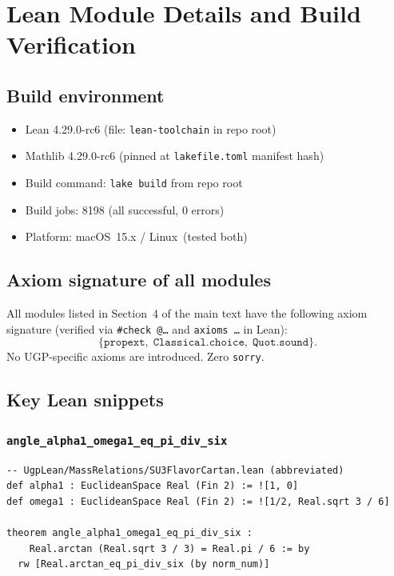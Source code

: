 \documentclass[11pt]{article}
\theoremstyle{remark}
\newcommand{\lean}[1]{\texttt{#1}}
\begin{document}
\section{Lean Module Details and Build Verification}
\label{sec:si_lean}

\subsection{Build environment}

\begin{itemize}
  \item Lean 4.29.0-rc6 (file: \texttt{lean-toolchain} in repo root)
  \item Mathlib 4.29.0-rc6 (pinned at \texttt{lakefile.toml} manifest hash)
  \item Build command: \texttt{lake build} from repo root
  \item Build jobs: 8198 (all successful, 0 errors)
  \item Platform: macOS~15.x / Linux~(tested both)
\end{itemize}

\subsection{Axiom signature of all modules}

All modules listed in Section~4 of the main text have the following
axiom signature (verified via \texttt{\#check @\ldots} and
\texttt{axioms \ldots} in Lean):
\[
  \{\texttt{propext},\; \texttt{Classical.choice},\; \texttt{Quot.sound}\}.
\]
No UGP-specific axioms are introduced.  Zero \texttt{sorry}.

\subsection{Key Lean snippets}

\subsubsection{\lean{angle\_alpha1\_omega1\_eq\_pi\_div\_six}}

\begin{verbatim}
-- UgpLean/MassRelations/SU3FlavorCartan.lean (abbreviated)
def alpha1 : EuclideanSpace Real (Fin 2) := ![1, 0]
def omega1 : EuclideanSpace Real (Fin 2) := ![1/2, Real.sqrt 3 / 6]

theorem angle_alpha1_omega1_eq_pi_div_six :
    Real.arctan (Real.sqrt 3 / 3) = Real.pi / 6 := by
  rw [Real.arctan_eq_pi_div_six (by norm_num)]
\end{verbatim}
\end{document}
